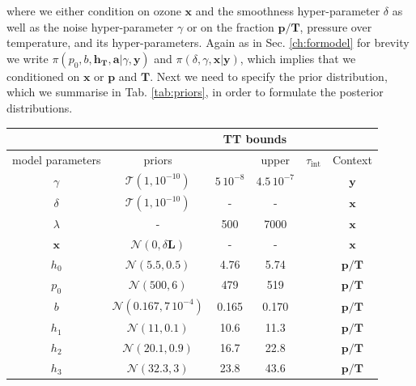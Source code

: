 where we either condition on ozone $\bm{x}$ and the smoothness hyper-parameter $\delta$ as well as the noise hyper-parameter $\gamma$ or on the fraction $\bm{p}/\bm{T}$, pressure over temperature, and its hyper-parameters.
Again as in Sec. \ref{ch:formodel} for brevity we write $\pi(p_0,b,\bm{h_T},\bm{a}| \gamma,\bm{y}) $ and $\pi(\delta, \gamma, \bm{x}|\bm{y})$, which implies that we conditioned on $\bm{x}$ or $\bm{p}$ and $\bm{T}$. 
Next we need to specify the prior distribution, which we summarise in Tab. \ref{tab:priors}, in order to formulate the posterior distributions.
\begin{table}
	\centering
	\begin{tabular}{ |c||c|c|c|c|c|   }
		\hline
		& &\multicolumn{2}{|c|}{TT bounds}& &\\
		\hline
		model parameters& priors&\makecell{lower}& \makecell{upper\\
		}&$\tau_{\text{int}}$&Context\\
		\hhline{|=||=|=|=|=|=|}
		$\gamma$ & $\mathcal{T}(1,10^{-10})$ &$5 \, 10^{-8}$ &$4.5 \, 10^{-7}$& &$\bm{y}$\\ \hline
		$\delta$ &$\mathcal{T}(1,10^{-10})$ & -&-& & $\bm{x}$\\ \hline
		$\lambda$ &- & 500&7000& &$\bm{x}$\\ \hline
		$\bm{x}$ &$\mathcal{N}(0,\delta \bm{L})$ & -&-&& $\bm{x}$\\ \hhline{|=||=|=|=|=|=|}
		$h_0$ &  $\mathcal{N}(5.5,0.5)$& 4.76&5.74&&$\bm{p/T}$\\ \hline
		$p_0$ &  $\mathcal{N}(500,6)$&479 &519&&$\bm{p/T}$\\ \hline
		$b$ &  $\mathcal{N}(0.167,7\,10^{-4})$& 0.165& 0.170 &&$\bm{p/T}$\\ \hline
		$h_{1}$ &  $\mathcal{N}(11,0.1)$&10.6 &11.3&&$\bm{p/T}$\\ \hline
		$h_{2}$ &  $\mathcal{N}(20.1,0.9)$&16.7 &22.8&&$\bm{p/T}$\\ \hline
		$h_{3}$ &  $\mathcal{N}(32.3,3)$&23.8&43.6&&$\bm{p/T}$\\ \hline

\end{tabular}
\end{table}
